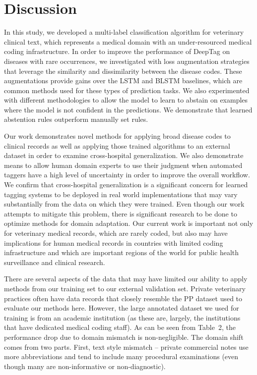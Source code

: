 \documentclass{article}[11pt,oneside]
\begin{document}
\section*{Discussion}

In this study, we developed a multi-label classification algorithm for veterinary clinical text, which represents a medical domain with an under-resourced medical coding infrastructure. In order to improve the performance of DeepTag on diseases with rare occurrences, we investigated with loss augmentation strategies that leverage the similarity and dissimilarity between the disease codes. These augmentations provide gains over the LSTM and BLSTM baselines, which are common methods used for these types of prediction tasks. We also experimented with different methodologies to allow the model to learn to abstain on examples where the model is not confident in the predictions. We demonstrate that learned abstention rules outperform manually set rules.

Our work demonstrates novel methods for applying broad disease codes to clinical records as well as applying those trained algorithms to an external dataset in order to examine cross-hospital generalization. We also demonstrate means to allow human domain experts to use their judgment when automated taggers have a high level of uncertainty in order to improve the overall workflow. We confirm that cross-hospital generalization is a significant concern for learned tagging systems to be deployed in real world implementations that may vary substantially from the data on which they were trained. 
Even though our work attempts to mitigate this problem, there is significant research to be done to optimize methods for domain adaptation.
Our current work is important not only for veterinary medical records, which are rarely coded, but also may have implications for human medical records in countries with limited coding infrastructure and which are important regions of the world for public health surveillance and clinical research. 

There are several aspects of the data that may have limited our ability to apply methods from our training set to our external validation set. Private veterinary practices often have data records that closely resemble the PP dataset used to evaluate our methods here. However, the large annotated dataset we used for training is from an academic institution (as these are, largely, the institutions that have dedicated medical coding staff). As can be seen from Table~2, the performance drop due to domain mismatch is non-negligible. The domain shift comes from two parts. First, text style mismatch -- private commercial notes use more abbreviations and tend to include many procedural examinations (even though many are non-informative or non-diagnostic). 
\end{document}
